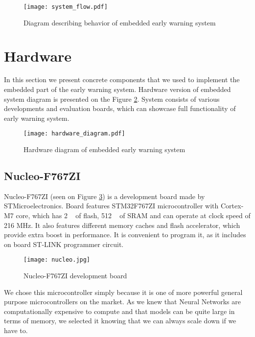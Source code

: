 \begin{figure}[ht]
        \centering
        \texttt{[image: system\_flow.pdf]} 
        \caption{ Diagram describing behavior of embedded early warning system} 
        \label{system_flow}
\end{figure}


\section{ Hardware}

In this section we present concrete components that we used to implement the embedded part of the early warning system.
Hardware version of embedded system diagram is presented on the Figure \ref{hardware_diagram}.
System consists of various developments and evaluation boards, which can showcase full functionality of early warning system.

\begin{figure}[ht]
        \centering
        \texttt{[image: hardware\_diagram.pdf]} 
        \caption{ Hardware diagram of embedded early warning system} 
        \label{hardware_diagram}
\end{figure}


\subsection{ Nucleo-F767ZI}

Nucleo-F767ZI (seen on Figure \ref{nucleo}) is a development board made by STMicroelectronics.
Board features STM32F767ZI microcontroller with Cortex-M7 core, which has 2 \si{\mega\byte} of flash, 512 \si{\kilo\byte} of SRAM and can operate at clock speed of 216 \si{\mega\hertz}.
It also features different memory caches and flash accelerator, which provide extra boost in performance.
It is convenient to program it, as it includes on board ST-LINK programmer circuit.

\begin{figure}[ht]
        \centering
        \texttt{[image: nucleo.jpg]} 
        \caption{ Nucleo-F767ZI development board} 
        \label{nucleo}
\end{figure}

We chose this microcontroller simply because it is one of more powerful general purpose microcontrollers on the market.
As we knew that Neural Networks are computationally expensive to compute and that models can be quite large in terms of memory, we selected it knowing that we can always scale down if we have to.


